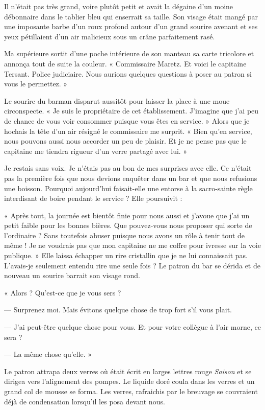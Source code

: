 Il n'était pas très grand, voire plutôt petit et avait la dégaine d'un moine débonnaire dans le tablier bleu qui 
enserrait sa taille. Son visage était mangé par une imposante barbe d'un roux profond autour d'un grand sourire 
avenant et ses yeux pétillaient d'un air malicieux sous un crâne parfaitement rasé.

Ma supérieure sortit d'une poche intérieure de son manteau sa carte tricolore et annonça tout de suite la couleur. « 
Commissaire Maretz. Et voici le capitaine Tersant. Police judiciaire. Nous aurions quelques questions à poser au 
patron si vous le permettez. »

Le sourire du barman disparut aussitôt pour laisser la place à une moue circonspecte. « Je suis le propriétaire de cet 
établissement. J'imagine que j'ai peu de chance de vous voir consommer puisque vous êtes en service. » Alors que je 
hochais la tête d'un air résigné le commissaire me surprit. « Bien qu'en service, nous pouvons aussi nous accorder un 
peu de plaisir. Et je ne pense pas que le capitaine me tiendra rigueur d'un verre partagé avec lui. »

Je restais sans voix. Je n'étais pas au bon de mes surprises avec elle. Ce n'était pas la première fois que nous devions 
enquêter dans un bar et que nous refusions une boisson. Pourquoi aujourd'hui faisait-elle une entorse à la sacro-sainte 
règle interdisant de boire pendant le service ? Elle poursuivit : 

« Après tout, la journée est bientôt finie pour nous aussi et j'avoue que j'ai un petit faible pour les bonnes bières. 
Que pouvez-vous nous proposer qui sorte de l'ordinaire ? Sans toutefois abuser puisque nous avons un rôle à tenir tout 
de même ! Je ne voudrais pas que mon capitaine ne me coffre pour ivresse sur la voie publique. » Elle laissa échapper 
un rire cristallin que je ne lui connaissait pas. L'avais-je seulement entendu rire une seule fois ? Le patron du bar 
se dérida et de nouveau un sourire barrait son visage rond.

« Alors ? Qu'est-ce que je vous sers ?

— Surprenez moi. Mais évitons quelque chose de trop fort s'il vous plait.

— J'ai peut-être quelque chose pour vous. Et pour votre collègue à l'air morne, ce sera ?

— La même chose qu'elle. »

Le patron attrapa deux verres où était écrit en larges lettres rouge \emph{Saison} et se dirigea vers l'alignement des 
pompes. Le liquide doré coula dans les verres et un grand col de mousse se forma. Les verres, rafraichis par le 
breuvage se couvraient déjà de condensation lorsqu'il les posa devant nous.

